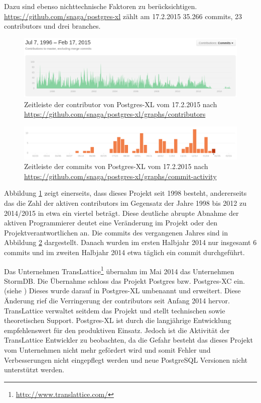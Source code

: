 Dazu sind ebenso nichttechnische Faktoren zu berücksichtigen.\\
\url{https://github.com/snaga/postgres-xl} zählt am 17.2.2015 35.266 commits, 23 contributors und drei branches.
\begin{figure}[h!]
\centering
\includegraphics[width=\textwidth]{Abbildungen/postgresxl_timeline_contributors.png}
\caption[Zeitleiste der contributor von Postgres-XL]{Zeitleiste der contributor von Postgres-XL vom 17.2.2015 nach \url{https://github.com/snaga/postgres-xl/graphs/contributors}}
\label{fig:timeline_contr_postgresxl}
\end{figure}
\begin{figure}[h!]
\centering
\includegraphics[width=\textwidth]{Abbildungen/postgresxl_timeline_commits.png}
\caption[Zeitleiste der commits von Postgres-XL]{Zeitleiste der commits von Postgres-XL vom 17.2.2015 nach \url{https://github.com/snaga/postgres-xl/graphs/commit-activity}}
\label{fig:timeline_commits_postgresxl}
\end{figure}
Abbildung \ref{fig:timeline_contr_postgresxl} zeigt einerseits, dass dieses Projekt seit 1998 besteht, andererseits das die Zahl der aktiven contributors im Gegensatz der Jahre 1998 bis 2012 zu 2014/2015 in etwa ein viertel beträgt.
Diese deutliche abrupte Abnahme der aktiven Programmierer deutet eine Veränderung im Projekt oder den Projektverantwortlichen an.
Die commits des vergangenen Jahres sind in Abbildung \ref{fig:timeline_commits_postgresxl} dargestellt.
Danach wurden im ersten Halbjahr 2014 nur insgesamt 6 commits und im zweiten Halbjahr 2014 etwa täglich ein commit durchgeführt.

Das Unternehmen TransLattice\footnote{\url{http://www.translattice.com/}} übernahm im Mai 2014 das Unternehmen StormDB.
Die Übernahme schloss das Projekt Postgres bzw. Postgres-XC ein. (siehe \cite{website:translattice-stormdb})
Dieses wurde darauf in Postgres-XL umbenannt und erweitert.
Diese Änderung rief die Verringerung der contributors seit Anfang 2014 hervor.
TransLattice verwaltet seitdem das Projekt und stellt technischen sowie theoretischen Support.
Postgres-XL ist durch die langjährige Entwicklung empfehlenswert für den produktiven Einsatz.
Jedoch ist die Aktivität der TransLattice Entwickler zu beobachten, da die Gefahr besteht das dieses Projekt vom Unternehmen nicht mehr gefördert wird und somit Fehler und Verbesserungen nicht eingepflegt werden und neue PostgreSQL Versionen nicht unterstützt werden.


